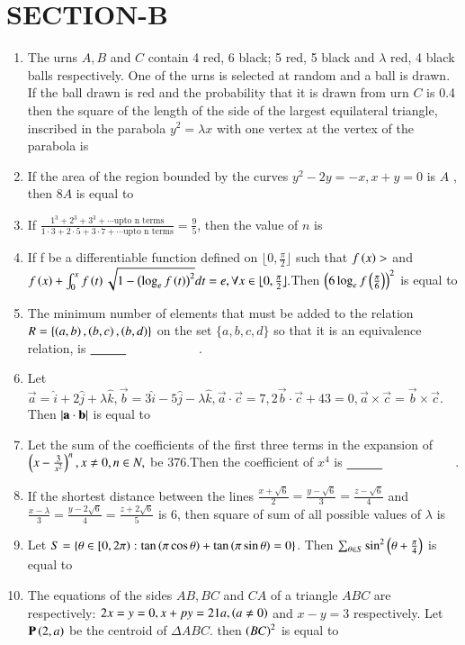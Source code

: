 \documentclass[journal,12pt,onecolumn]{IEEEtran}
\theoremstyle{remark}
\begin{document}
\section{SECTION-B}
\begin{enumerate}
    \item The urns $A, B$ and $C$ contain 4 red, 6 black; 5 red, 5 black and $\lambda$ red, 4 black balls respectively. One of the urns is selected at random and a ball is drawn. If the ball drawn is red and the probability that it is drawn from urn $C$ is 0.4 then the square of the length of the side of the largest equilateral triangle, inscribed in the parabola $y^2 = \lambda x$ with one vertex at the vertex of the parabola is
    \item If the area of the region bounded by the curves $y^2-2y=-x,x+y=0$ is $A$ , then $8A$ is equal to
    \item If $\frac{1^3+2^3+3^3+\cdots \text{upto n terms}}{1\cdot 3+2\cdot 5+3 \cdot 7+\cdots\text{upto n terms}}=\frac{9}{5}$, then the value of $n$ is
    \item If f be a differentiable function defined on $\lfloor 0,\frac{\pi}{2} \rfloor $ such that $f\left(x\right)>$ and $f\left(x\right)+\int_{0}^{x}f\left(t\right)\sqrt{1-\left(\log_ef\left(t\right)\right)^2}dt=e,\forall x \in \lfloor 0,\frac{\pi}{2} \rfloor.$Then $\left(6\log_ef\left(\frac{\pi}{6}\right)\right)^2$ is equal to
    \item The minimum number of elements that must be added to the relation $R = \{\left(a, b\right), \left(b, c\right), \left(b, d\right)\}$ on the set $\{a, b, c, d\}$ so that it is an equivalence relation, is $\makebox[3cm][l]{\underline{\hspace{1cm}}}$.
    \item Let $\vec{a}=\hat{i}+2\hat{j}+\lambda\hat{k},\vec{b}=3\hat{i}-5\hat{j}-\lambda\hat{k},\vec{a}\cdot\vec{c}=7,2\vec{b}\cdot\vec{c}+43=0,\vec{a}\times\vec{c}=\vec{b}\times\vec{c}.$ Then $\left\vert\mathbf{a}\cdot\mathbf{b}\right\vert$ is equal to
    \item Let the sum of the coefficients of the first three terms in the expansion of $\left(x-\frac{3}{x^2}\right)^n,x\neq 0,n \in N,$ be 376.Then the coefficient of $x^4$ is $\makebox[3cm][l]{\underline{\hspace{1cm}}}$.
    \item If the shortest distance between the lines $\frac{x
    +\sqrt{6}}{2}=\frac{y-\sqrt{6}}{3}=\frac{z-\sqrt{6}}{4}$ and $\frac{x-\lambda}{3}=\frac{y-2\sqrt{6}}{4}=\frac{z+2\sqrt{6}}{5}$ is 6, then square of sum of all possible values of $\lambda$ is 
    \item Let $S=\{\theta \in [0,2\pi):\tan\left(\pi\cos\theta\right)+\tan\left(\pi\sin\theta\right)=0\}$. Then $\sum_{\theta \in S}\sin^2\left(\theta+\frac{\pi}{4}\right)$ is equal to
    \item The equations of the sides $AB,BC$ and $CA$ of a triangle $ABC $ are respectively: $2x=y=0,x+py=21a,\left(a\neq 0\right)$ and $x-y=3$ respectively. Let $\mathbf{P}\left(2,a\right)$ be the centroid of $\Delta ABC$. then $\left(BC\right)^2$ is equal to
\end{enumerate}
\end{document}
